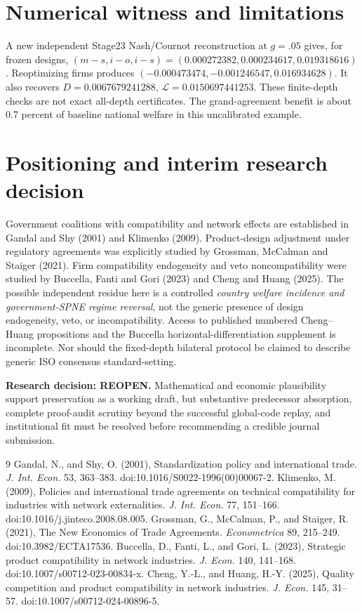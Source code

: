 \documentclass[11pt,a4paper]{article}
\begin{document}
\section{Numerical witness and limitations}
A new independent Stage23 Nash/Cournot reconstruction at $g=.05$ gives, for frozen designs, $(m-s,i-o,i-s)=(0.000272382,0.000234617,0.019318616)$. Reoptimizing firms produces $(-0.000473474,-0.001246547,0.016934628)$. It also recovers $D=0.0067679241288$, $\mathcal L=0.0150697441253$. These finite-depth checks are not exact all-depth certificates. The grand-agreement benefit is about 0.7 percent of baseline national welfare in this uncalibrated example.

\section{Positioning and interim research decision}
Government coalitions with compatibility and network effects are established in Gandal and Shy (2001) and Klimenko (2009). Product-design adjustment under regulatory agreements was explicitly studied by Grossman, McCalman and Staiger (2021). Firm compatibility endogeneity and veto noncompatibility were studied by Buccella, Fanti and Gori (2023) and Cheng and Huang (2025). The possible independent residue here is a controlled \emph{country welfare incidence and government-SPNE regime reversal}, not the generic presence of design endogeneity, veto, or incompatibility. Access to published numbered Cheng--Huang propositions and the Buccella horizontal-differentiation supplement is incomplete. Nor should the fixed-depth bilateral protocol be claimed to describe generic ISO consensus standard-setting.

\medskip\noindent\textbf{Research decision: REOPEN.} Mathematical and economic plausibility support preservation as a working draft, but substantive predecessor absorption, complete proof-audit scrutiny beyond the successful global-code replay, and institutional fit must be resolved before recommending a credible journal submission.
\begin{thebibliography}{9}\small
{} Gandal, N., and Shy, O. (2001), Standardization policy and international trade. \emph{J. Int. Econ.} 53, 363--383. doi:10.1016/S0022-1996(00)00067-2.
 Klimenko, M. (2009), Policies and international trade agreements on technical compatibility for industries with network externalities. \emph{J. Int. Econ.} 77, 151--166. doi:10.1016/j.jinteco.2008.08.005.
 Grossman, G., McCalman, P., and Staiger, R. (2021), The New Economics of Trade Agreements. \emph{Econometrica} 89, 215--249. doi:10.3982/ECTA17536.
 Buccella, D., Fanti, L., and Gori, L. (2023), Strategic product compatibility in network industries. \emph{J. Econ.} 140, 141--168. doi:10.1007/s00712-023-00834-x.
 Cheng, Y.-L., and Huang, H.-Y. (2025), Quality competition and product compatibility in network industries. \emph{J. Econ.} 145, 31--57. doi:10.1007/s00712-024-00896-5.
\end{thebibliography}
\end{document}
